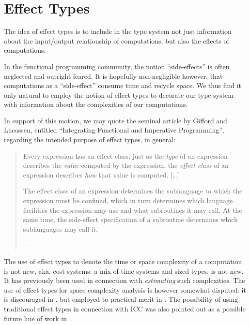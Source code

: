 \chapter{Effect Types}

The idea of effect types is to include in the type system not just information
about the input/output relationship of computations, but also the effects of
computations.

In the functional programming community, the notion ``side-effects'' is often
neglected and outright feared. It is hopefully non-negligible however, that
computations as a ``side-effect'' consume time and recycle space. We thus find
it only natural to employ the notion of effect types to decorate our type
system with information about the complexities of our computations.

In support of this motion, we may quote the seminal article by Gifford and
Lucassen, entitled ``Integrating Functional and Imperative Programming'',
regarding the intended purpose of effect types, in general:

\begin{quotation}

\footnotesize\sffamily\itshape

Every expression has an effect class; just as the \emph{type} of an expression
describes the \emph{value} computed by the expression, the \emph{effect class}
of an expression describes \emph{how} that value is computed. [\ldots]

The effect class of an expression determines the sublanguage to which the
expression must be confined, which in turn determines which language facilities
the expression may use and what subroutines it may call. At the same time, the
side-effect specification of a subroutine determines which sublanguages may
call it.

\begin{flushright}

\footnotesize\sffamily

--- \cite{gifford-lucassen-1986}

\end{flushright}

\end{quotation}

The use of effect types to denote the time or space complexity of a computation
is not new, aka. cost systems: a mix of time systems and sized types, is not
new. It has previously been used in connection with \emph{estimating} such
complexities\cite{dornic-et-al-1992,dornic-1993,reistad-gifford-1994}. The use
of effect types for space complexity analysis is however somewhat disputed: it
is discouraged in \cite{crary-weirich-2000}, but employed to practical merit in
\cite{hofmann-jost-2003}. The possibility of using traditional effect types in
connection with ICC was also pointed out as a possible future line of work in
\cite{hofmann-2003}.
